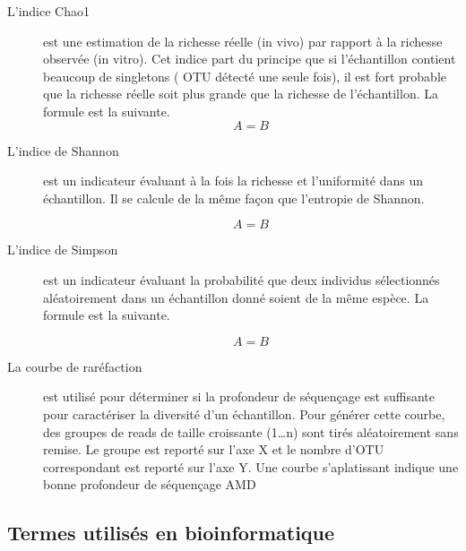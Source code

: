 \documentclass[12pt,a4paper]{article}
\begin{document}
\begin{description}
\item[L'indice Chao1] est une estimation de la richesse réelle (in vivo) par rapport à la richesse observée (in vitro). Cet indice part du principe que si l’échantillon contient beaucoup de singletons ( OTU détecté une seule fois), il est fort probable que la richesse réelle soit plus grande que la richesse de l’échantillon. La formule est la suivante.
\begin{equation}
A = B
\end{equation}

\item[L'indice de Shannon] est un indicateur évaluant à la fois la richesse et l’uniformité dans un échantillon. Il se calcule de la même façon que l’entropie de Shannon.

\begin{equation}
A = B
\end{equation}

\item[L'indice de Simpson] est un indicateur évaluant la probabilité que deux individus sélectionnés aléatoirement dans un échantillon donné soient de la même espèce. La formule est la suivante.

\begin{equation}
A = B
\end{equation}


\item[La courbe de raréfaction] est utilisé pour déterminer si la profondeur de séquençage est suffisante pour caractériser la diversité d’un échantillon.
Pour générer cette courbe, des groupes de reads de taille croissante (1…n) sont tirés aléatoirement sans remise. Le groupe est reporté sur l'axe X et le nombre d’OTU correspondant est reporté sur l’axe Y.
Une courbe s’aplatissant indique une bonne profondeur de séquençage \citep{Dickson2014} AMD \citep{Beck}

\end{description}


\subsection{Termes utilisés en bioinformatique}
\end{document}
